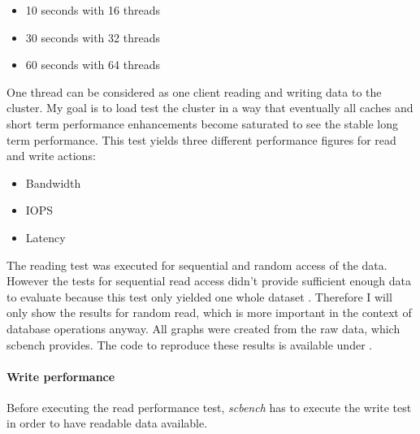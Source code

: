 \documentclass[titlepage, a4paper, 11pt]{scrartcl}
\begin{document}
            \begin{itemize}
                \item 10 seconds with 16 threads
                \item 30 seconds with 32 threads
                \item 60 seconds with 64 threads
            \end{itemize}
            
            One thread can be considered as one client reading and writing data to the cluster.
            My goal is to load test the cluster in a way that eventually all caches and short term performance enhancements become saturated to see the stable long term performance. This test yields three different performance figures for read and write actions:

            \begin{itemize}
                \item Bandwidth
                \item IOPS
                \item Latency
            \end{itemize}

            The reading test was executed for sequential and random access of the data. However the tests for sequential read access didn't provide sufficient enough data to evaluate because this test only yielded one whole dataset 
            \cite{resultscbench}. Therefore I will only show the results for random read, which is more important in the context of database operations anyway.
            All graphs were created from the raw data, which scbench provides. The code to reproduce these results is available under \cite{ghceph}.

            \paragraph{Write performance}

                Before executing the read performance test, \textit{scbench} has to execute the write test in order to have readable data available.
\end{document}

